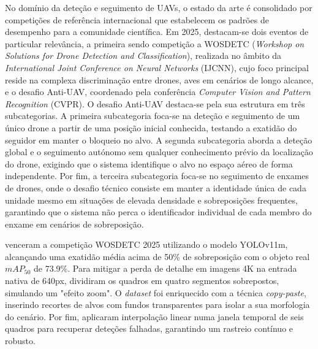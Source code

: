 No domínio da deteção e seguimento de UAVs, o estado da arte é consolidado por competições de referência internacional que estabelecem os padrões de desempenho para a comunidade científica. Em 2025, destacam-se dois eventos de particular relevância, a primeira sendo competição a WOSDETC (\emph{Workshop on Solutions for Drone Detection and Classification}), realizada no âmbito da \emph{International Joint Conference on Neural Networks} (IJCNN), cujo foco principal reside na complexa discriminação entre drones, aves em cenários de longo alcance, e o desafio Anti-UAV, coordenado pela conferência \emph{Computer Vision and Pattern Recognition} (CVPR). O desafio Anti-UAV destaca-se pela sua estrutura em três subcategorias. A primeira subcategoria foca-se na deteção e seguimento de um único drone a partir de uma posição inicial conhecida, testando a exatidão do seguidor em manter o bloqueio no alvo. A segunda subcategoria aborda a deteção global e o seguimento autónomo sem qualquer conhecimento prévio da localização do drone, exigindo que o sistema identifique o alvo no espaço aéreo de forma independente. Por fim, a terceira subcategoria foca-se no seguimento de enxames de drones, onde o desafio técnico consiste em manter a identidade única de cada unidade mesmo em situações de elevada densidade e sobreposições frequentes, garantindo que o sistema não perca o identificador individual de cada membro do enxame em cenários de sobreposição.

\cite{WOSDETC25} venceram a competição WOSDETC 2025 utilizando o modelo YOLOv11m, alcançando uma exatidão média acima de 50\% de sobreposição com o objeto real $mAP_{50}$  de 73.9\%. Para mitigar a perda de detalhe em imagens 4K na entrada nativa de 640px, dividiram os quadros em quatro segmentos sobrepostos, simulando um "efeito zoom". O \emph{dataset} foi enriquecido com a técnica \emph{copy-paste}, inserindo recortes de alvos com fundos transparentes para isolar a sua morfologia do cenário. Por fim, aplicaram interpolação linear numa janela temporal de seis quadros para recuperar deteções falhadas, garantindo um rastreio contínuo e robusto.

